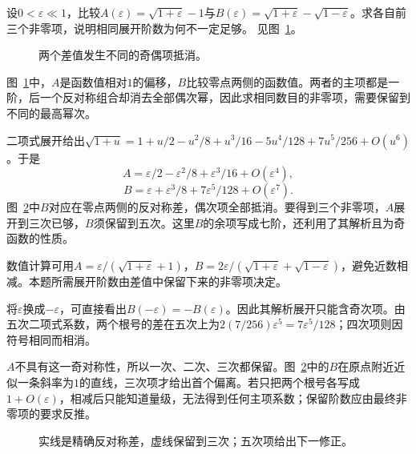 \begin{exercise}[两个小量接近抵消]\label{ex:c1-h20}
设$0<\varepsilon\ll1$，比较$A(\varepsilon)=\sqrt{1+\varepsilon}-1$与$B(\varepsilon)=\sqrt{1+\varepsilon}-\sqrt{1-\varepsilon}$。求各自前三个非零项，说明相同展开阶数为何不一定足够。 见图~\ref{fig:c1-h20-q}。
\end{exercise}

\begin{figure}[H]\centering
{}
\caption{两个差值发生不同的奇偶项抵消。}\label{fig:c1-h20-q}
\end{figure}
\begin{solution}
图~\ref{fig:c1-h20-q}中，$A$是函数值相对$1$的偏移，$B$比较零点两侧的函数值。两者的主项都是一阶，后一个反对称组合却消去全部偶次幂，因此求相同数目的非零项，需要保留到不同的最高幂次。


二项式展开给出$\sqrt{1+u}=1+u/2-u^2/8+u^3/16-5u^4/128+7u^5/256+O(u^6)$。于是
\[\boxed{A=\varepsilon/2-\varepsilon^2/8+\varepsilon^3/16+O(\varepsilon^4)},\]
\[\boxed{B=\varepsilon+\varepsilon^3/8+7\varepsilon^5/128+O(\varepsilon^7)}.\]
图~\ref{fig:c1-h20-s}中$B$对应在零点两侧的反对称差，偶次项全部抵消。要得到三个非零项，$A$展开到三次已够，$B$须保留到五次。这里$B$的余项写成七阶，还利用了其解析且为奇函数的性质。

数值计算可用$A=\varepsilon/(\sqrt{1+\varepsilon}+1)$，$B=2\varepsilon/(\sqrt{1+\varepsilon}+\sqrt{1-\varepsilon})$，避免近数相减。本题所需展开阶数由差值中保留下来的非零项决定。


将$\varepsilon$换成$-\varepsilon$，可直接看出$B(-\varepsilon)=-B(\varepsilon)$。因此其解析展开只能含奇次项。由五次二项式系数，两个根号的差在五次上为$2(7/256)\varepsilon^5=7\varepsilon^5/128$；四次项则因符号相同而相消。

$A$不具有这一奇对称性，所以一次、二次、三次都保留。图~\ref{fig:c1-h20-s}中的$B$在原点附近近似一条斜率为$1$的直线，三次项才给出首个偏离。若只把两个根号各写成$1+O(\varepsilon)$，相减后只能知道量级，无法得到任何主项系数；保留阶数应由最终非零项的要求反推。

\begin{figure}[H]\centering
{}
\caption{实线是精确反对称差，虚线保留到三次；五次项给出下一修正。}\label{fig:c1-h20-s}
\end{figure}
\end{solution}
